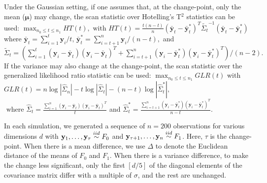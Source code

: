 \documentclass[arxiv, preprint]{imsart}
\numberwithin{equation}{section}
\theoremstyle{plain}
\begin{document}
Under the Gaussian setting, if one assumes that, at the change-point, only the mean ($\mathbf{\mu}$) may change, the scan statistic over Hotelling's T$^2$ statistics can be used: $\max_{n_0\leq t\leq n_1} HT(t), \text{ with }HT(t) = \frac{t(n-t)}{n}(\bar{\mathbf{y}}_t - \bar{\mathbf{y}}^*_t)^T \tilde{\Sigma_t}^{-1}(\bar{\mathbf{y}}_t - \bar{\mathbf{y}}^*_t)$ where
$ \bar{\mathbf{y}}_t = \sum_{i=1}^t \mathbf{y}_i/t, \,  \bar{\mathbf{y}}^*_t = \sum_{i=t+1}^n \mathbf{y}_i/(n-t),$ and 
$\tilde{\Sigma}_t = (\sum_{i=1}^t (\mathbf{y}_i - \bar{\mathbf{y}}_t)(\mathbf{y}_i - \bar{\mathbf{y}}_t)^T + \sum_{i=t+1}^n(\mathbf{y}_i - \bar{\mathbf{y}}^*_t)(\mathbf{y}_i - \bar{\mathbf{y}}^*_t)^T)/(n-2).$
 If the variance may also change at the change-point, the scan statistic over the generalized likelihood ratio statistic can be used:
 $\max_{n_0\leq t\leq n_1} GLR(t)$ with $GLR(t) = n \log |\hat{\Sigma}_n| - t \log |\hat{\Sigma}_t| - (n-t)\log|\hat{\Sigma}^*_t|,$
$\text{ where } \hat{\Sigma}_t = \frac{\sum_{i=1}^n(\mathbf{y}_i - \bar{\mathbf{y}}_t)(\mathbf{y}_i - \bar{\mathbf{y}}_t)^T}{t}$ and $ \hat{\Sigma}^*_t = \frac{\sum_{i=t+1}^n (\mathbf{y}_i - \bar{\mathbf{y}}^*_t)(\mathbf{y}_i - \bar{\mathbf{y}}^*_t)^T}{n-t}. $


In each simulation, we generated a sequence of $n=200$ observations for various dimensions $d$ with $\mathbf{y}_1,\dots, \mathbf{y}_\tau \overset{iid}{\sim} F_0$ and $\mathbf{y}_{\tau+1}, \dots, \mathbf{y}_n\overset{iid}{\sim} F_1$.  Here, $\tau$ is the change-point.
 When there is a mean difference, we use $\Delta$ to denote the Euclidean distance of the means of $F_0$ and $F_1$.  When there is a variance difference,  to make the change less significant, only the first $[d/5]$ of the diagonal elements of the covariance matrix differ with a multiple of $\sigma$, and the rest are unchanged.
\end{document}
